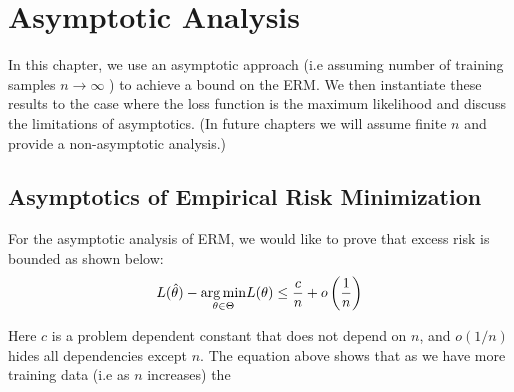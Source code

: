 \documentclass{article}
\begin{document}
\section{Asymptotic Analysis}
In this chapter, we use an asymptotic approach (i.e assuming number of training samples $n \rightarrow \infty$ ) to achieve a bound on the ERM. We then instantiate these results to the case where the loss function is the maximum likelihood and discuss the limitations of asymptotics. (In future chapters we will assume finite $n$ and provide a non-asymptotic analysis.)

\subsection{Asymptotics of Empirical Risk Minimization}
For the asymptotic analysis of ERM, we would like to prove that excess risk is bounded as shown below:
\begin{align*}
L(\hat{\theta})-{\operatorname*{arg\,min}_{\theta \in \Theta}} L(\theta) \leq \frac{c}{n}+o\left(\frac{1}{n}\right)
\end{align*}
\begin{rema}
Here $c$ is a problem dependent constant that does not depend on $n$, and $o(1 / n)$ hides all dependencies except $n .$ The equation above shows that as we have more training data (i.e as $n$ increases) the 
\end{rema}
\end{document}
